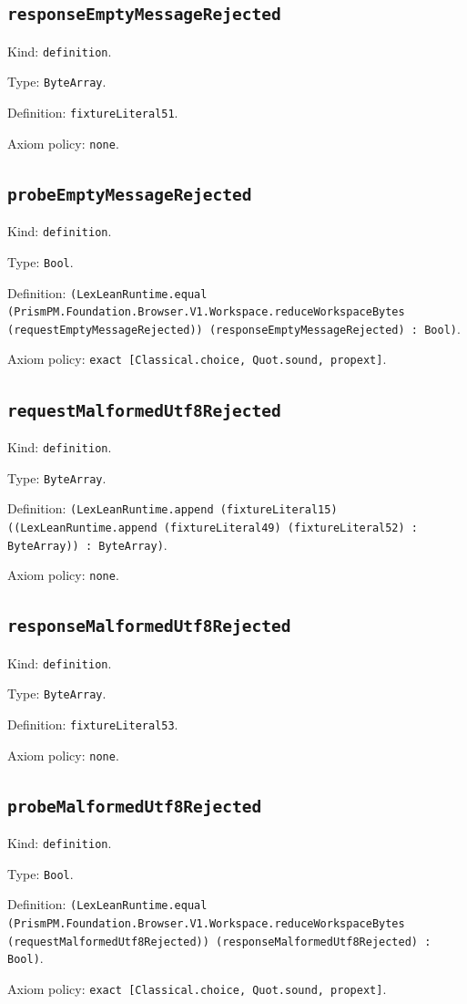 \documentclass[11pt]{article}
\begin{document}
\subsection*{\texttt{responseEmptyMessageRejected}}
\noindent Kind: \texttt{definition}.\par
\noindent Type: \texttt{ByteArray}.\par
\noindent Definition: \texttt{fixtureLiteral51}.\par
\noindent Axiom policy: \texttt{none}.\par
\subsection*{\texttt{probeEmptyMessageRejected}}
\noindent Kind: \texttt{definition}.\par
\noindent Type: \texttt{Bool}.\par
\noindent Definition: \texttt{(LexLeanRuntime.equal (PrismPM.Foundation.Browser.V1.Workspace.reduceWorkspaceBytes (requestEmptyMessageRejected)) (responseEmptyMessageRejected) : Bool)}.\par
\noindent Axiom policy: \texttt{exact [Classical.choice, Quot.sound, propext]}.\par
\subsection*{\texttt{requestMalformedUtf8Rejected}}
\noindent Kind: \texttt{definition}.\par
\noindent Type: \texttt{ByteArray}.\par
\noindent Definition: \texttt{(LexLeanRuntime.append (fixtureLiteral15) ((LexLeanRuntime.append (fixtureLiteral49) (fixtureLiteral52) : ByteArray)) : ByteArray)}.\par
\noindent Axiom policy: \texttt{none}.\par
\subsection*{\texttt{responseMalformedUtf8Rejected}}
\noindent Kind: \texttt{definition}.\par
\noindent Type: \texttt{ByteArray}.\par
\noindent Definition: \texttt{fixtureLiteral53}.\par
\noindent Axiom policy: \texttt{none}.\par
\subsection*{\texttt{probeMalformedUtf8Rejected}}
\noindent Kind: \texttt{definition}.\par
\noindent Type: \texttt{Bool}.\par
\noindent Definition: \texttt{(LexLeanRuntime.equal (PrismPM.Foundation.Browser.V1.Workspace.reduceWorkspaceBytes (requestMalformedUtf8Rejected)) (responseMalformedUtf8Rejected) : Bool)}.\par
\noindent Axiom policy: \texttt{exact [Classical.choice, Quot.sound, propext]}.\par
\end{document}
